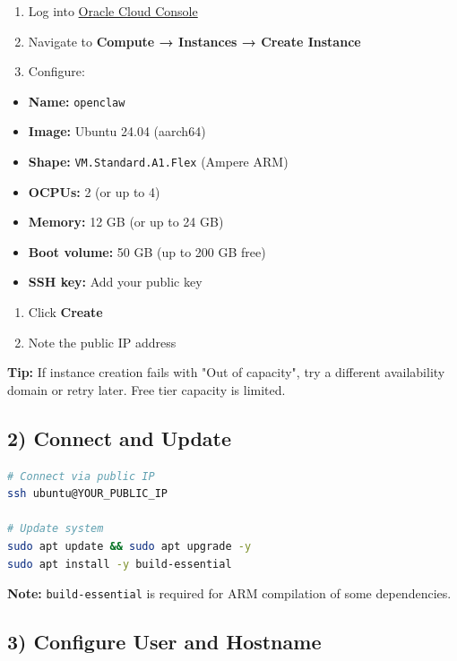\begin{enumerate}
  \item Log into \href{https://cloud.oracle.com/}{Oracle Cloud Console}
  \item Navigate to \textbf{Compute → Instances → Create Instance}
  \item Configure:
\end{enumerate}

\begin{itemize}
  \item \textbf{Name:} \texttt{openclaw}
  \item \textbf{Image:} Ubuntu 24.04 (aarch64)
  \item \textbf{Shape:} \texttt{VM.Standard.A1.Flex} (Ampere ARM)
  \item \textbf{OCPUs:} 2 (or up to 4)
  \item \textbf{Memory:} 12 GB (or up to 24 GB)
  \item \textbf{Boot volume:} 50 GB (up to 200 GB free)
  \item \textbf{SSH key:} Add your public key
\end{itemize}

\begin{enumerate}
  \item Click \textbf{Create}
  \item Note the public IP address
\end{enumerate}


\textbf{Tip:} If instance creation fails with "Out of capacity", try a different availability domain or retry later. Free tier capacity is limited.

\subsection{2) Connect and Update}


\begin{lstlisting}[language=bash]
# Connect via public IP
ssh ubuntu@YOUR_PUBLIC_IP

# Update system
sudo apt update && sudo apt upgrade -y
sudo apt install -y build-essential
\end{lstlisting}


\textbf{Note:} \texttt{build-essential} is required for ARM compilation of some dependencies.

\subsection{3) Configure User and Hostname}


